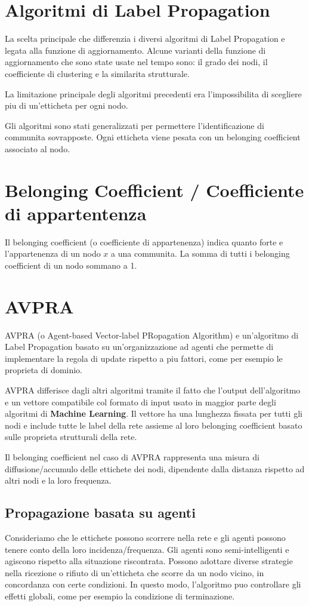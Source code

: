 \documentclass[a4paper,12pt]{report}
\begin{document}
	\section{Algoritmi di Label Propagation}
	La scelta principale che differenzia i diversi algoritmi di Label Propagation e legata alla funzione di aggiornamento. Alcune varianti della funzione di aggiornamento che sono state usate nel tempo sono: il grado dei nodi, il coefficiente di clustering e la similarita strutturale.

	La limitazione principale degli algoritmi precedenti era l'impossibilita di scegliere piu di un'etticheta per ogni nodo. 

	Gli algoritmi sono stati generalizzati per permettere l'identificazione di communita sovrapposte. Ogni etticheta viene pesata con un belonging coefficient associato al nodo. 

	\section{Belonging Coefficient / Coefficiente di appartentenza}
	Il belonging coefficient (o coefficiente di appartenenza) indica quanto forte e l'appartenenza di un nodo $x$ a una communita. La somma di tutti i belonging coefficient di un nodo sommano a 1. \cite{gregory}

	\section{AVPRA}
	AVPRA (o Agent-based Vector-label PRopagation Algorithm) e un'algoritmo di Label Propagation basato su un'organizzazione ad agenti che permette di implementare la regola di update rispetto a piu fattori, come per esempio le proprieta di dominio. 

	AVPRA differisce dagli altri algoritmi tramite il fatto che l'output dell'algoritmo e un vettore compatibile col formato di input usato in maggior parte degli algoritmi di \textbf{Machine Learning}. Il vettore ha una lunghezza fissata per tutti gli nodi e include tutte le label della rete assieme al loro belonging coefficient basato sulle proprieta strutturali della rete. 

	Il belonging coefficient nel caso di AVPRA rappresenta una misura di diffusione/accumulo delle ettichete dei nodi, dipendente dalla distanza rispetto ad altri nodi e la loro frequenza. \cite{avpra} 

		\subsection{Propagazione basata su agenti}
		Consideriamo che le ettichete possono scorrere nella rete e gli agenti possono tenere conto della loro incidenza/frequenza. Gli agenti sono semi-intelligenti e agiscono rispetto alla situazione riscontrata. Possono adottare diverse strategie nella ricezione o rifiuto di un'etticheta che scorre da un nodo vicino, in concordanza con certe condizioni. In questo modo, l'algoritmo puo controllare gli effetti globali, come per esempio la condizione di terminazione.
\end{document}
